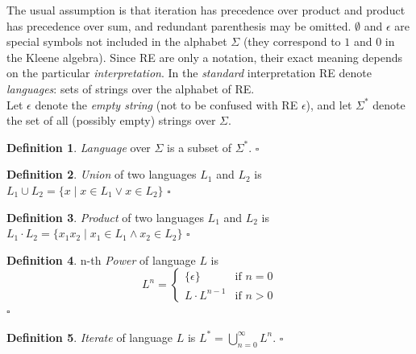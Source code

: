 \documentclass{article}
\newcommand{\Xin}{\!\in\!}
\newcommand{\Xeq}{\!=\!}
\theoremstyle{definition}
\newtheorem{Xdef}{Definition}
\begin{document}
\begin{multicols}{2}
The usual assumption is that iteration has precedence over product and product has precedence over sum,
and redundant parenthesis may be omitted.
$\emptyset$ and $\epsilon$ are special symbols not included in the alphabet $\Sigma$ (they correspond to $1$ and $0$ in the Kleene algebra).
Since RE are only a notation, their exact meaning depends on the particular \emph{interpretation}.
In the \emph{standard} interpretation RE denote \emph{languages}: sets of strings over the alphabet of RE.
\\

Let $\epsilon$ denote the \emph{empty string} (not to be confused with RE $\epsilon$),
and let $\Sigma^*$ denote the set of all (possibly empty) strings over $\Sigma$.

    \begin{Xdef}
    \emph{Language} over $\Sigma$ is a subset of $\Sigma^*$.
    $\square$
    \end{Xdef}

    \begin{Xdef}\label{langunion}
    \emph{Union} of two languages $L_1$ and $L_2$ is
    $L_1 \cup L_2 = \{ x \mid x \Xin L_1 \vee x \Xin L_2 \}$
    $\square$
    \end{Xdef}

    \begin{Xdef}\label{langproduct}
    \emph{Product} of two languages $L_1$ and $L_2$ is
    $L_1 \cdot L_2 = \{ x_1 x_2 \mid x_1 \Xin L_1 \wedge x_2 \Xin L_2 \}$
    $\square$
    \end{Xdef}

    \begin{Xdef}\label{langiterate}
    n-th \emph{Power} of language $L$ is
    $$L^n = \begin{cases}
            \{ \epsilon \} & \text{if } n \Xeq 0 \\[-0.5em]
            L \cdot L^{n - 1} & \text{if } n\!>\!0
        \end{cases}$$
    $\square$
    \end{Xdef}

    \begin{Xdef}\label{langiterate}
    \emph{Iterate} of language $L$ is
    $L^* = \bigcup\limits_{n = 0}^\infty L^n$.
    $\square$
    \end{Xdef}


\end{multicols}
\end{document}
